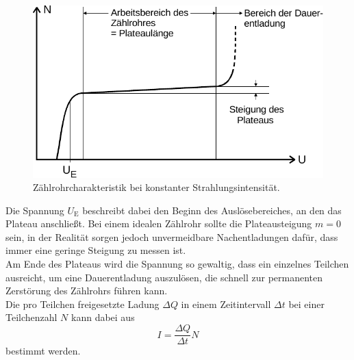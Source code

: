 \begin{figure}[H]
    \centering
    \includegraphics{figures/Abb_4.pdf}
    \caption{Zählrohrcharakteristik bei konstanter Strahlungsintensität\cite{ap03}.}
    \label{fig:abb4}
\end{figure}

Die Spannung $U_{\text{E}}$ beschreibt dabei
den Beginn des Auslösebereiches, an den das
Plateau anschließt.
Bei einem idealen Zählrohr sollte die Plateausteigung
$m = 0$ sein, in der Realität sorgen jedoch unvermeidbare
Nachentladungen dafür, dass immer eine geringe Steigung zu messen ist. \\

Am Ende des Plateaus wird die Spannung so gewaltig,
dass ein einzelnes Teilchen ausreicht, um
eine Dauerentladung auszulösen, die schnell
zur permanenten Zerstörung des Zählrohrs führen kann. \\

Die pro Teilchen freigesetzte Ladung $\Delta Q$ in einem Zeitintervall $\Delta t$ bei einer Teilchenzahl $N$ kann dabei aus
\begin{equation}
    I = \frac{\Delta Q}{\Delta t} N
    \label{eq:teilchenstrom}
\end{equation}
bestimmt werden.


